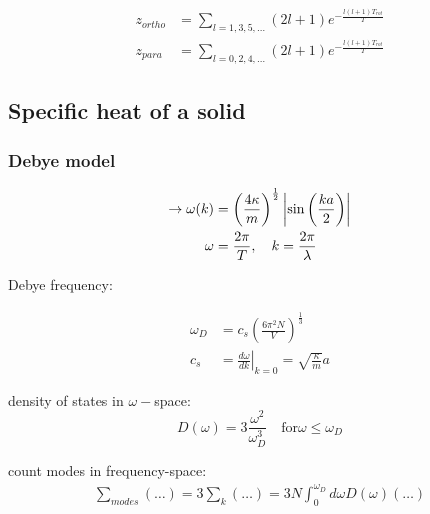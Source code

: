 \begin{equation*}
    \begin{aligned}
        z_{ortho} &= \sum_{l=1,3,5,\dots} (2l +1) e^{- \frac{l(l+1) T_{rot}}{T}} \\
        z_{para} &= \sum_{l=0,2,4,\dots} (2l +1) e^{- \frac{l(l+1) T_{rot}}{T}}
    \end{aligned}
\end{equation*}

\subsection*{Specific heat of a solid}

\subsubsection*{Debye model}

\begin{equation*}
    \begin{aligned}
        \rightarrow \omega(k) &= \left(\frac{4 \kappa}{m}\right)^{\frac{1}{2}} \left\vert\sin \left(\frac{ka}{2}\right)\right\vert \\
        \omega &= \frac{2 \pi}{T}, \quad k = \frac{2 \pi}{\lambda} \\
    \end{aligned}
\end{equation*}

Debye frequency:

\begin{equation*}
    \begin{aligned}
        \omega_D &= c_s \left(\frac{6 \pi^2 N}{V}\right)^{\frac{1}{3}} \\
        c_s &= \left. \frac{d\omega}{dk} \right|_{k=0} = \sqrt{\frac{\kappa}{m}}a
    \end{aligned}
\end{equation*}

density of states in $\omega-$space:
\begin{equation*}
    D(\omega) = 3 \frac{\omega^2}{\omega_D^3} \quad \text{for} \omega \leq \omega_D
\end{equation*}

count modes in frequency-space:
\begin{equation*}
    \begin{aligned}
        \sum_{modes} (\dots) = 3 \sum_k (\dots) = 3N \int_0^{\omega_D} d\omega D(\omega) (\dots)
    \end{aligned}
\end{equation*}

